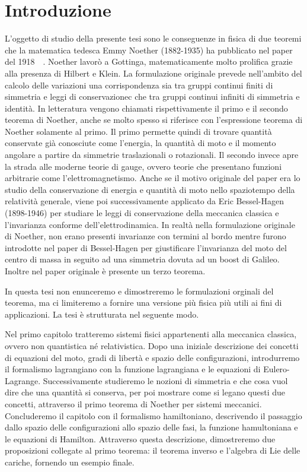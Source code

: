 \chapter{Introduzione}

    L'oggetto di studio della presente tesi sono le conseguenze in fisica di due teoremi che la matematica tedesca Emmy Noether (1882-1935) ha pubblicato nel paper del 1918~\cite{noether}~\cite{noether2}. Noether lavorò a Gottinga, matematicamente molto prolifica grazie alla presenza di Hilbert e Klein. La formulazione originale prevede nell'ambito del calcolo delle variazioni una corrispondenza sia tra gruppi continui finiti di simmetria e leggi di conservazionec che tra gruppi continui infiniti di simmetria e identità. In letteratura vengono chiamati rispettivamente il primo e il secondo teorema di Noether, anche se molto spesso si riferisce con l'espressione teorema di Noether solamente al primo. Il primo permette quindi di trovare quantità conservate già conosciute come l'energia, la quantità di moto e il momento angolare a partire da simmetrie traslazionali o rotazionali. Il secondo invece apre la strada alle moderne teorie di gauge, ovvero teorie che presentano funzioni arbitrarie come l'elettromagnetismo. Anche se il motivo originale del paper era lo studio della conservazione di energia e quantità di moto nello spaziotempo della relatività generale, viene poi successivamente applicato da Eric Bessel-Hagen (1898-1946) per studiare le leggi di conservazione della meccanica classica e l'invarianza conforme dell'elettrodinamica. In realtà nella formulazione originale di Noether, non erano presenti invarianze con termini al bordo mentre furono introdotte nel paper di Bessel-Hagen per giustificare l'invarianza del moto del centro di massa in seguito ad una simmetria dovuta ad un boost di Galileo. Inoltre nel paper originale è presente un terzo teorema.

    In questa tesi non enunceremo e dimostreremo le formulazioni orginali del teorema, ma ci limiteremo a fornire una versione più fisica più utili ai fini di applicazioni. La tesi è strutturata nel seguente modo. 
    
    Nel primo capitolo tratteremo sistemi fisici appartenenti alla meccanica classica, ovvero non quantistica né relativistica. Dopo una iniziale descrizione dei concetti di equazioni del moto, gradi di libertà e spazio delle configurazioni, introdurremo il formalismo lagrangiano con la funzione lagrangiana e le equazioni di Eulero-Lagrange. Successivamente studieremo le nozioni di simmetria e che cosa vuol dire che una quantità si conserva, per poi mostrare come si legano questi due concetti, attraverso il primo teorema di Noether per sistemi meccanici. Concluderemo il capitolo con il formalismo hamiltoniano, descrivendo il passaggio dallo spazio delle configurazioni allo spazio delle fasi, la funzione hamultoniana e le equazioni di Hamilton. Attraverso questa descrizione, dimostreremo due proposizioni collegate al primo teorema: il teorema inverso e l'algebra di Lie delle cariche, fornendo un esempio finale.


